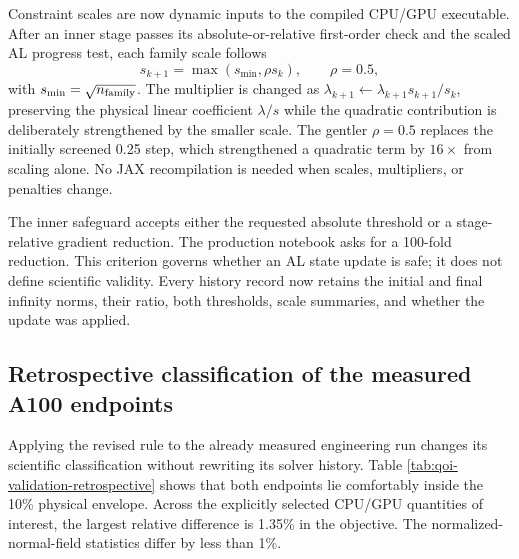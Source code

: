 \documentclass[11pt,a4paper]{article}
\begin{document}
Constraint scales are now dynamic inputs to the compiled CPU/GPU executable.
After an inner stage passes its absolute-or-relative first-order check and the
scaled AL progress test, each family scale follows
\[
 s_{k+1}=\max(s_{\min},\rho s_k),\qquad \rho=0.5,
 \]
with $s_{\min}=\sqrt{n_{\rm family}}$.  The multiplier is changed as
$\lambda_{k+1}\leftarrow\lambda_{k+1}s_{k+1}/s_k$, preserving the physical
linear coefficient $\lambda/s$ while the quadratic contribution is
deliberately strengthened by the smaller scale.  The gentler $\rho=0.5$
replaces the initially screened 0.25 step, which strengthened a quadratic term
by $16\times$ from scaling alone.  No JAX recompilation is needed when scales,
multipliers, or penalties change.

The inner safeguard accepts either the requested absolute threshold or a
stage-relative gradient reduction.  The production notebook asks for a
100-fold reduction.  This criterion governs whether an AL state update is safe;
it does not define scientific validity.  Every history record now retains the
initial and final infinity norms, their ratio, both thresholds, scale summaries,
and whether the update was applied.

\subsection{Retrospective classification of the measured A100 endpoints}

Applying the revised rule to the already measured engineering run changes its
scientific classification without rewriting its solver history.  Table
\ref{tab:qoi-validation-retrospective} shows that both endpoints lie comfortably
inside the 10\% physical envelope.  Across the explicitly selected CPU/GPU
quantities of interest, the largest relative difference is 1.35\% in the
objective.  The normalized-normal-field statistics differ by less than 1\%.
\end{document}

